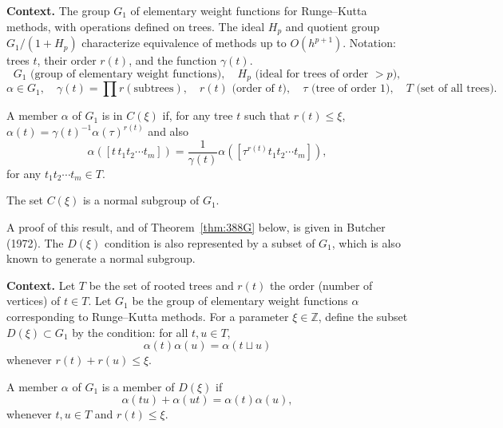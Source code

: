 \begin{theorem}
\noindent\textbf{Context.}
The group $G_1$ of elementary weight functions for Runge--Kutta methods, with operations defined on trees. The ideal $H_p$ and quotient group $G_1/(1+H_p)$ characterize equivalence of methods up to $O(h^{p+1})$. Notation: trees $t$, their order $r(t)$, and the function $\gamma(t)$.
\[
G_1 \text{ (group of elementary weight functions)},\quad H_p \text{ (ideal for trees of order $>p$)},
\]
\[
\alpha \in G_1,\quad \gamma(t)=\prod r(\text{subtrees}),\quad r(t) \text{ (order of $t$)},\quad \tau \text{ (tree of order 1)},\quad T \text{ (set of all trees)}.
\]

\begin{definition}

  \label{def:388D}
A member $\alpha$ of $G_1$ is in $C(\xi)$ if, for any tree $t$ such that $r(t) \leq \xi$, $\alpha(t) = \gamma(t)^{-1} \alpha(\tau)^{r(t)}$ and also
\[
\alpha([t\, t_1 t_2 \cdots t_m]) = \frac{1}{\gamma(t)} \alpha([\tau^{r(t)} t_1 t_2 \cdots t_m]), \tag{388c}
\]
for any $t_1 t_2 \cdots t_m \in T$.
\end{definition}

\begin{theorem}

  \label{thm:388E}
The set $C(\xi)$ is a normal subgroup of $G_1$.

A proof of this result, and of Theorem~\ref{thm:388G} below, is given in Butcher (1972).
The $D(\xi)$ condition is also represented by a subset of $G_1$, which is also known to generate a normal subgroup.
\end{theorem}

\noindent\textbf{Context.}
Let $T$ be the set of rooted trees and $r(t)$ the order (number of vertices) of $t\in T$. Let $G_1$ be the group of elementary weight functions $\alpha$ corresponding to Runge--Kutta methods. For a parameter $\xi\in\mathbb{Z}$, define the subset $D(\xi)\subset G_1$ by the condition: for all $t,u\in T$,
\[
\alpha(t)\alpha(u)=\alpha(t\sqcup u)
\]
whenever $r(t)+r(u)\le\xi$.

\begin{definition}

  \label{def:388F}
A member $\alpha$ of $G_1$ is a member of $D(\xi)$ if
\[
\alpha(tu) + \alpha(ut) = \alpha(t)\alpha(u),
\]
whenever $t, u \in T$ and $r(t) \leq \xi$.
\end{definition}


\end{theorem}
